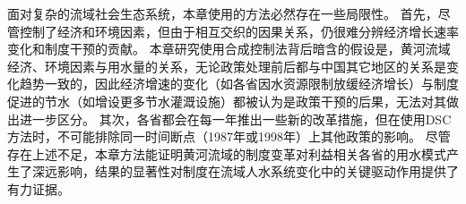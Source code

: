 面对复杂的流域社会\textendash{}生态系统，本章使用的方法必然存在一些局限性。
首先，尽管控制了经济和环境因素，但由于相互交织的因果关系，仍很难分辨经济增长速率变化和制度干预的贡献。
本章研究使用合成控制法背后暗含的假设是，黄河流域经济、环境因素与用水量的关系，无论政策处理前后都与中国其它地区的关系是变化趋势一致的，因此经济增速的变化（如各省因水资源限制放缓经济增长）与制度促进的节水（如增设更多节水灌溉设施）都被认为是政策干预的后果，无法对其做出进一步区分。
其次，各省都会在每一年推出一些新的改革措施，但在使用DSC方法时，不可能排除同一时间断点（1987年或1998年）上其他政策的影响。
尽管存在上述不足，本章方法能证明黄河流域的制度变革对利益相关各省的用水模式产生了深远影响，结果的显著性对制度在流域人水系统变化中的关键驱动作用提供了有力证据。
